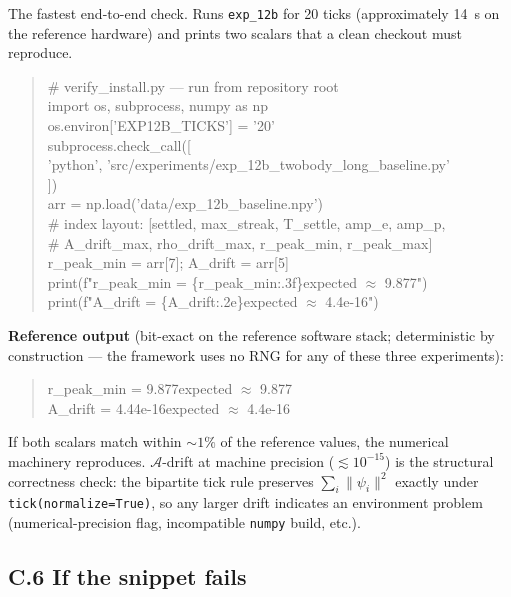 The fastest end-to-end check.  Runs \texttt{exp\_12b} for 20 ticks
(approximately 14~s on the reference hardware) and prints two
scalars that a clean checkout must reproduce.

\begin{quote}\small\ttfamily
\# verify\_install.py --- run from repository root\\
import os, subprocess, numpy as np\\
os.environ['EXP12B\_TICKS'] = '20'\\
subprocess.check\_call([\\
\hphantom{xx}'python', 'src/experiments/exp\_12b\_twobody\_long\_baseline.py'\\
])\\[0.3em]
arr = np.load('data/exp\_12b\_baseline.npy')\\
\# index layout: [settled, max\_streak, T\_settle, amp\_e, amp\_p,\\
\#                A\_drift\_max, rho\_drift\_max, r\_peak\_min, r\_peak\_max]\\
r\_peak\_min = arr[7]; A\_drift = arr[5]\\
print(f"r\_peak\_min = \{r\_peak\_min:.3f\}\hphantom{x}expected $\approx$ 9.877")\\
print(f"A\_drift\hphantom{xxxxx} = \{A\_drift:.2e\}\hphantom{xx}expected $\approx$ 4.4e-16")
\end{quote}

\noindent\textbf{Reference output} (bit-exact on the reference
software stack; deterministic by construction --- the framework
uses no RNG for any of these three experiments):

\begin{quote}\small\ttfamily
r\_peak\_min = 9.877\hphantom{x}expected $\approx$ 9.877\\
A\_drift\hphantom{xxxxx} = 4.44e-16\hphantom{x}expected $\approx$ 4.4e-16
\end{quote}

If both scalars match within $\sim 1\%$ of the reference values, the
numerical machinery reproduces.  $\mathcal{A}$-drift at machine
precision ($\lesssim 10^{-15}$) is the structural correctness check:
the bipartite tick rule preserves $\sum_i \lVert\psi_i\rVert^2$
exactly under \texttt{tick(normalize=True)}, so any larger drift
indicates an environment problem (numerical-precision flag,
incompatible \texttt{numpy} build, etc.).

\subsection*{C.6 If the snippet fails}

